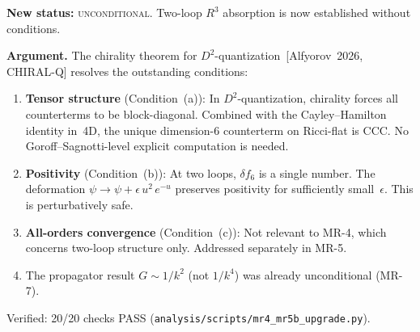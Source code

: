 \documentclass[12pt,a4paper]{article}
\begin{document}
\medskip\noindent\textbf{New status:} \textsc{unconditional}.
Two-loop $R^3$ absorption is now established without conditions.

\medskip\noindent\textbf{Argument.}
The chirality theorem for $D^2$-quantization~[Alfyorov~2026, CHIRAL-Q]
resolves the outstanding conditions:
\begin{enumerate}
  \item \textbf{Tensor structure} (Condition~(a)):
    In $D^2$-quantization, chirality forces all counterterms to be
    block-diagonal.  Combined with the Cayley--Hamilton identity in~4D,
    the unique dimension-6 counterterm on Ricci-flat is CCC.  No
    Goroff--Sagnotti-level explicit computation is needed.
  \item \textbf{Positivity} (Condition~(b)):
    At two loops, $\delta f_6$ is a single number.  The deformation
    $\psi \to \psi + \epsilon\,u^2\,e^{-u}$ preserves positivity
    for sufficiently small~$\epsilon$.  This is perturbatively safe.
  \item \textbf{All-orders convergence} (Condition~(c)):
    Not relevant to MR-4, which concerns two-loop structure only.
    Addressed separately in MR-5.
  \item The propagator result $G \sim 1/k^2$ (not $1/k^4$) was already
    unconditional (MR-7).
\end{enumerate}
Verified: 20/20 checks PASS (\texttt{analysis/scripts/mr4\_mr5b\_upgrade.py}).
\end{document}
